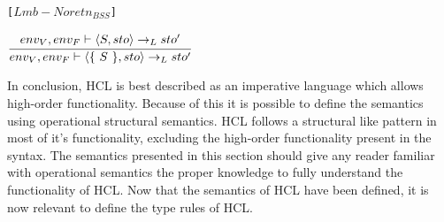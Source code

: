 \texttt{[$Lmb-Noretn_{BSS}$]}
\begin{center}
	\begin{math}
		\cfrac
			{env_V, env_F \vdash \langle S, sto \rangle \rightarrow_L sto'}
			{env_V, env_F \vdash \langle \{\ S\ \}, sto \rangle \rightarrow_L sto'}
	\end{math}
\end{center}

In conclusion, HCL is best described as an imperative language which allows high-order functionality. 
Because of this it is possible to define the semantics using operational structural semantics.
HCL follows a structural like pattern in most of it's functionality, excluding the high-order functionality present in the syntax.
The semantics presented in this section should give any reader familiar with operational semantics the proper knowledge to fully understand the functionality of HCL.
Now that the semantics of HCL have been defined, it is now relevant to define the type rules of HCL.
